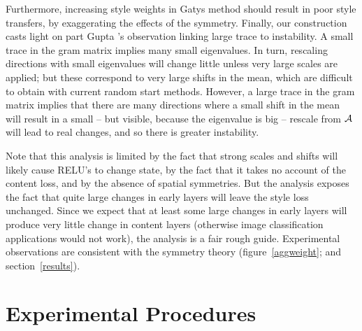 \documentclass[runningheads]{llncs}
\newcommand{\matx}[1]{{\cal {#1}}}
\begin{document}
Furthermore, increasing style weights in Gatys method should result in poor
style transfers, by exaggerating the effects of the symmetry.    Finally, our construction casts light on part Gupta \ea's
observation linking large trace to instability. A small trace in the gram matrix implies many small eigenvalues.  In
turn, rescaling directions with small eigenvalues will change little unless very large scales are applied; but these
correspond to very large shifts in the mean, which are difficult to obtain with current random start methods.  However,
a large trace in the gram matrix implies that there are many directions where a small shift in the mean will result in a
small -- but visible, because the eigenvalue is big -- rescale from $\matx{A}$ will lead to real changes, and so there
is greater instability. 

Note that this analysis is limited by the fact that strong scales and shifts will likely cause RELU's to change state,
by the fact that it takes no account of the content loss, and by the absence of spatial symmetries.
But the analysis exposes the fact that quite large changes in early layers will leave the style loss unchanged.
Since we expect that at least some large changes in early layers will produce very little change in content
layers (otherwise image classification applications would not work), the analysis is a fair rough guide. Experimental
observations are consistent with the symmetry theory  (figure~\ref{aggweight}; and
section~\ref{results}).

\section{Experimental Procedures\label{ExpPro}}
\end{document}
